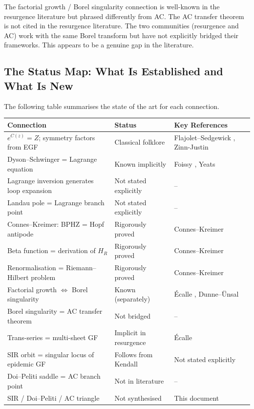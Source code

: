 \documentclass[11pt,a4paper]{article}
\theoremstyle{definition}
\begin{document}
\begin{resultbox}[Status]
The factorial growth / Borel singularity connection is well-known in the
resurgence literature \cite{ecalle1981, dunne2014} but phrased differently
from AC. The AC transfer theorem is not cited in the resurgence literature.
The two communities (resurgence and AC) work with the same Borel transform
but have not explicitly bridged their frameworks. This appears to be a
genuine gap in the literature.
\end{resultbox}

\subsection{The Status Map: What Is Established and What Is New}
\label{sec:statusmap}

The following table summarises the state of the art for each connection.

\begin{center}
\renewcommand{\arraystretch}{1.35}
\begin{tabular}{p{4.5cm}p{3cm}p{5cm}}
\toprule
\textbf{Connection} & \textbf{Status} & \textbf{Key References} \\
\midrule
$e^{C(z)} = Z$; symmetry factors from EGF & Classical folklore & Flajolet--Sedgewick \cite{flajolet2009}, Zinn-Justin \cite{zinjustin2002} \\
\midrule
Dyson--Schwinger = Lagrange equation & Known implicitly & Foissy \cite{foissy2007}, Yeats \cite{yeats2017} \\
Lagrange inversion generates loop expansion & Not stated explicitly & -- \\
Landau pole = Lagrange branch point & Not stated explicitly & -- \\
\midrule
Connes--Kreimer: BPHZ = Hopf antipode & Rigorously proved & Connes--Kreimer \cite{conneskreimer1998, conneskreimer2000} \\
Beta function = derivation of $H_R$ & Rigorously proved & Connes--Kreimer \cite{conneskreimer2000} \\
Renormalisation = Riemann--Hilbert problem & Rigorously proved & Connes--Kreimer \cite{conneskreimer2000} \\
\midrule
Factorial growth $\Leftrightarrow$ Borel singularity & Known (separately) & \'Ecalle \cite{ecalle1981}, Dunne--\"Unsal \cite{dunne2014} \\
Borel singularity = AC transfer theorem & Not bridged & -- \\
Trans-series = multi-sheet GF & Implicit in resurgence & \'Ecalle \cite{ecalle1981} \\
\midrule
SIR orbit = singular locus of epidemic GF & Follows from Kendall \cite{kendall1956} & Not stated explicitly \\
Doi--Peliti saddle = AC branch point & Not in literature & -- \\
SIR / Doi--Peliti / AC triangle & Not synthesised & This document \\
\bottomrule
\end{tabular}
\end{center}
\end{document}
